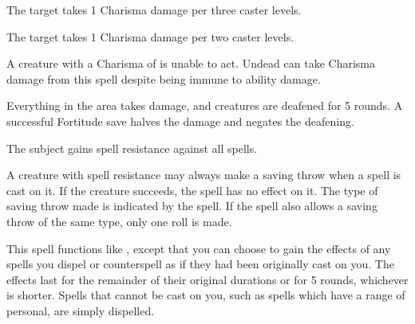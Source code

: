 \spellrng{\rngfar}
\begin{spellhealthy}
  The target takes 1 Charisma damage per three caster levels.
\end{spellhealthy}
\begin{spellblood}
  The target takes 1 Charisma damage per two caster levels.
\end{spellblood}
\begin{spellnotes}
  A creature with a Charisma of  is unable to act. Undead can take Charisma damage from this spell despite being immune to ability damage. 
\end{spellnotes}

\spellrng{\rngclose}
\begin{spelleffect}
  Everything in the area takes damage, and creatures are deafened for 5 rounds. A successful Fortitude save halves the damage and negates the deafening.
\end{spelleffect}

\spellrng{\rngclose}
\spelldur{\durshort}
\begin{spelleffect}
  The subject gains spell resistance against all spells.
\end{spelleffect}
\begin{spellnotes}
  A creature with spell resistance may always make a saving throw when a spell is cast on it. If the creature succeeds, the spell has no effect on it. The type of saving throw made is indicated by the spell. If the spell also allows a saving throw of the same type, only one roll is made.
\end{spellnotes}

\begin{spelleffect}
  This spell functions like , except that you can choose to gain the effects of any spells you dispel or counterspell as if they had been originally cast on you. The effects last for the remainder of their original durations or for 5 rounds, whichever is shorter. Spells that cannot be cast on you, such as spells which have a range of personal, are simply dispelled.
\end{spelleffect}

